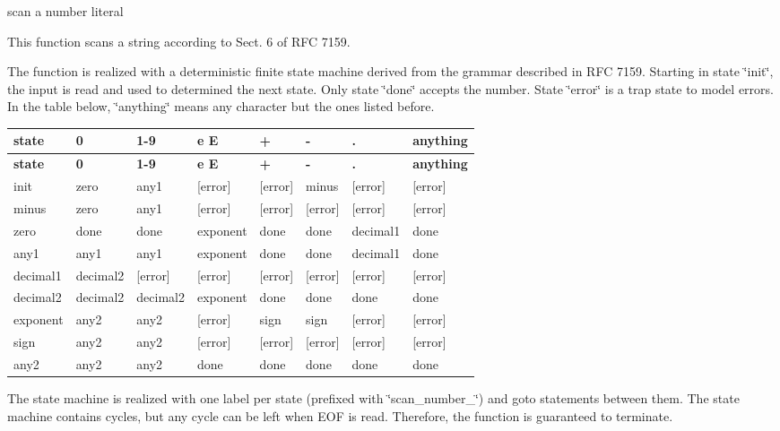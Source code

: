scan a number literal 

This function scans a string according to Sect. 6 of R\+FC 7159.

The function is realized with a deterministic finite state machine derived from the grammar described in R\+FC 7159. Starting in state \char`\"{}init\char`\"{}, the input is read and used to determined the next state. Only state \char`\"{}done\char`\"{} accepts the number. State \char`\"{}error\char`\"{} is a trap state to model errors. In the table below, \char`\"{}anything\char`\"{} means any character but the ones listed before.

\tabulinesep=1mm
\begin{longtabu} spread 0pt [c]{*{8}{|X[-1]}|}
\hline
\rowcolor{\tableheadbgcolor}\textbf{ state }&\textbf{ 0 }&\textbf{ 1-\/9 }&\textbf{ e E }&\textbf{ + }&\textbf{ -\/ }&\textbf{ . }&\textbf{ anything  }\\
\endfirsthead
\hline
\endfoot
\hline
\rowcolor{\tableheadbgcolor}\textbf{ state }&\textbf{ 0 }&\textbf{ 1-\/9 }&\textbf{ e E }&\textbf{ + }&\textbf{ -\/ }&\textbf{ . }&\textbf{ anything  }\\
\endhead
init &zero &any1 &\mbox{[}error\mbox{]} &\mbox{[}error\mbox{]} &minus &\mbox{[}error\mbox{]} &\mbox{[}error\mbox{]} \\
minus &zero &any1 &\mbox{[}error\mbox{]} &\mbox{[}error\mbox{]} &\mbox{[}error\mbox{]} &\mbox{[}error\mbox{]} &\mbox{[}error\mbox{]} \\
zero &done &done &exponent &done &done &decimal1 &done \\
any1 &any1 &any1 &exponent &done &done &decimal1 &done \\
decimal1 &decimal2 &\mbox{[}error\mbox{]} &\mbox{[}error\mbox{]} &\mbox{[}error\mbox{]} &\mbox{[}error\mbox{]} &\mbox{[}error\mbox{]} &\mbox{[}error\mbox{]} \\
decimal2 &decimal2 &decimal2 &exponent &done &done &done &done \\
exponent &any2 &any2 &\mbox{[}error\mbox{]} &sign &sign &\mbox{[}error\mbox{]} &\mbox{[}error\mbox{]} \\
sign &any2 &any2 &\mbox{[}error\mbox{]} &\mbox{[}error\mbox{]} &\mbox{[}error\mbox{]} &\mbox{[}error\mbox{]} &\mbox{[}error\mbox{]} \\
any2 &any2 &any2 &done &done &done &done &done \\
\end{longtabu}
The state machine is realized with one label per state (prefixed with \char`\"{}scan\+\_\+number\+\_\+\char`\"{}) and {\ttfamily goto} statements between them. The state machine contains cycles, but any cycle can be left when E\+OF is read. Therefore, the function is guaranteed to terminate.

